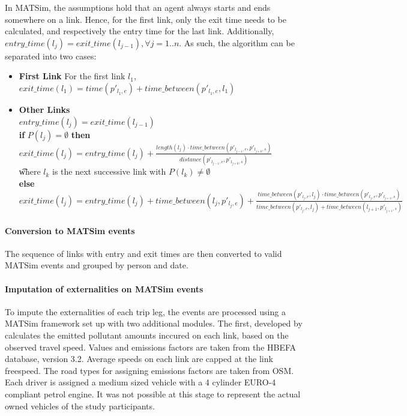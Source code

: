 In MATSim, the assumptions hold that an agent always starts and ends somewhere on a link.
Hence, for the first link, only the exit time needs to be calculated, and respectively the entry time for the last link.
Additionally, $entry\_time(l_{j}) = exit\_time(l_{j-1}),  \forall j = 1..n$.
As such, the algorithm can be separated into two cases:
\begin{itemize}
	\item \textbf{First Link} For the first link $l_1$, $exit\_time(l_1) = time(p'_{l_1,e}) + time\_between(p'_{l_1,e}, l_1)$
	\item \textbf{Other Links} \\
		$entry\_time(l_{j}) = exit\_time(l_{j-1}) $ \\
		\textbf{if} $P(l_j) = \emptyset$ \textbf{then} $exit\_time(l_j) = entry\_time(l_j) + 
										\frac{length(l_j) \cdot time\_between(p'_{l_{j-1},e}, p'_{l_{j+k},s})}{distance(p'_{l_{j-1},e}, p'_{l_{j+k},s})} $ \\
										\t where $l_{k}$ is the next successive link with $P(l_k) \neq \emptyset$  \\
		\textbf{else}  $exit\_time(l_j) = entry\_time(l_j) + time\_between(l_{j}, p'_{l_j,e}) + \frac{time\_between(p'_{l_j,e}, l_{j}) \cdot time\_between(p'_{l_j,e}, p'_{l_{j+1},s})} 
					{time\_between(p'_{l_j,e}, l_{j}) + time\_between(l_{j+1},p'_{l_{j+1},s})}   $ \\
\end{itemize}

\paragraph{Conversion to MATSim events} 
The sequence of links with entry and exit times are then converted to valid MATSim events and grouped by person and date.

\paragraph{Imputation of externalities on MATSim events}
To impute the externalities of each trip leg, the events are processed using a MATSim framework set up with two additional modules.
The first, developed by \citet{kaddoura2017simulation} calculates the emitted pollutant amounts inccured on each link, based on the observed travel speed.
Values and emissions factors are taken from the HBEFA database, version 3.2.
Average speeds on each link are capped at the link freespeed.
The road types for assigning emissions factors are taken from OSM.
Each driver is assigned a medium sized vehicle with a 4 cylinder EURO-4 compliant petrol engine.
It was not possible at this stage to represent the actual owned vehicles of the study participants.

